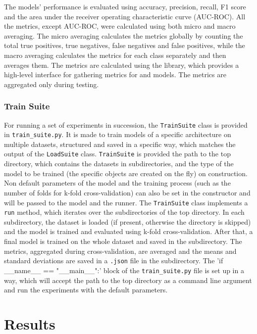 \documentclass[english, he, bc, kiv, iso690alph]{fasthesis}
\begin{document}
The models' performance is evaluated using accuracy, precision, recall, F1 score and the area under the receiver operating characteristic curve (AUC-ROC). All the metrics, except AUC-ROC, were calculated using both micro and macro averaging. The micro averaging calculates the metrics globally by counting the total true positives, true negatives, false negatives and false positives, while the macro averaging calculates the metrics for each class separately and then averages them.
The metrics are calculated using the  library, which provides a high-level interface for gathering metrics for  and  models. The metrics are aggregated only during testing.


\subsection{Train Suite}

For running a set of experiments in succession, the \texttt{TrainSuite} class is provided in \texttt{train\_suite.py}. It is made to train models of a specific architecture on multiple datasets, structured and saved in a specific way, which matches the output of the \texttt{LoadSuite} class. \texttt{TrainSuite} is provided the path to the top directory, which contains the datasets in subdirectories, and the type of the model to be trained (the specific objects are created on the fly) on construction. Non default parameters of the model and the training process (such as the number of folds for k-fold cross-validation) can also be set in the constructor and will be passed to the model and the runner. The \texttt{TrainSuite} class implements a \texttt{run} method, which iterates over the subdirectories of the top directory. In each subdirectory, the dataset is loaded (if present, otherwise the directory is skipped) and the model is trained and evaluated using k-fold cross-validation. After that, a final model is trained on the whole dataset and saved in the subdirectory. The metrics, aggregated during cross-validation, are averaged and the means and standard deviations are saved in a \texttt{.json} file in the subdirectory. The \command'if __name__ == "__main__":' block of the \texttt{train\_suite.py} file is set up in a way, which will accept the path to the top directory as a command line argument and run the experiments with the default parameters.

\chapter{Results}
\label{chap:results}
\end{document}
